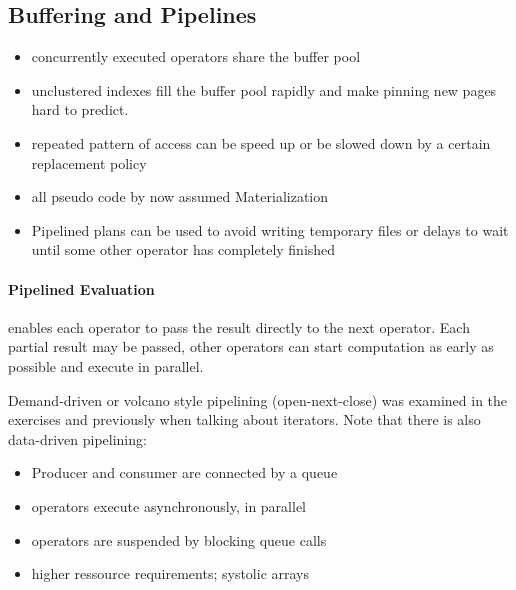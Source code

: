  \subsection{Buffering and Pipelines}
 \begin{itemize}
     \item concurrently executed operators share the buffer pool
     \item unclustered indexes fill the buffer pool rapidly and make pinning new pages hard to predict.
     \item repeated pattern of access can be speed up or be slowed down by a certain replacement policy
     \item all pseudo code by now assumed Materialization
     \item Pipelined plans can be used to avoid writing temporary files or delays to wait until some other operator has completely finished
 \end{itemize}
 
 \paragraph{Pipelined Evaluation} enables each operator to pass the result directly to the next operator. Each partial result may be passed, other operators can start computation as early as possible and execute in parallel.
 
 Demand-driven or volcano style pipelining (open-next-close) was examined in the exercises and previously when talking about iterators.
 Note that there is also data-driven pipelining:
 \begin{itemize}
    \item Producer and consumer are connected by a queue
    \item operators execute asynchronously, in parallel
    \item operators are suspended by blocking queue calls
    \item higher ressource requirements; systolic arrays
 \end{itemize}
 
 
